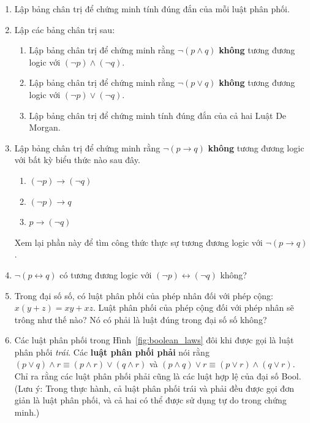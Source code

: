 \begin{enumerate}
\item[1.] Lập bảng chân trị để chứng minh tính đúng đắn của mỗi luật phân phối.

\item[2.] Lập các bảng chân trị sau:
\begin{enumerate}[label=\alph*)]
\item Lập bảng chân trị để chứng minh rằng $\lnot(p \land q)$ \textbf{không} tương đương logic với $(\lnot p) \land (\lnot q)$.
\item Lập bảng chân trị để chứng minh rằng $\lnot(p \lor q)$ \textbf{không} tương đương logic với $(\lnot p) \lor (\lnot q)$.
\item Lập bảng chân trị để chứng minh tính đúng đắn của cả hai Luật De Morgan.
\end{enumerate}

\item[3.] Lập bảng chân trị để chứng minh rằng $\lnot(p \to q)$ \textbf{không} tương đương logic với bất kỳ biểu thức nào sau đây.
\begin{enumerate}[label=\alph*)]
\item $(\lnot p) \to (\lnot q)$
\item $(\lnot p) \to q$
\item $p \to (\lnot q)$
\end{enumerate}
Xem lại phần này để tìm công thức thực sự tương đương logic với $\lnot(p \to q)$.

\item[$\dagger$4.] $\lnot(p \leftrightarrow q)$ có tương đương logic với $(\lnot p) \leftrightarrow (\lnot q)$ không?

\item[5.] Trong đại số số, có luật phân phối của phép nhân đối với phép cộng: $x(y + z) = xy + xz$. Luật phân phối của phép cộng đối với phép nhân sẽ trông như thế nào? Nó có phải là luật đúng trong đại số số không?

\item[6.] Các luật phân phối trong Hình~\ref{fig:boolean_laws} đôi khi được gọi là luật phân phối \emph{trái}. Các \textbf{luật phân phối phải} nói rằng $(p \lor q) \land r \equiv (p \land r) \lor (q \land r)$ và $(p \land q) \lor r \equiv (p \lor r) \land (q \lor r)$. Chỉ ra rằng các luật phân phối phải cũng là các luật hợp lệ của đại số Bool. (Lưu ý: Trong thực hành, cả luật phân phối trái và phải đều được gọi đơn giản là luật phân phối, và cả hai có thể được sử dụng tự do trong chứng minh.)


\end{enumerate}
